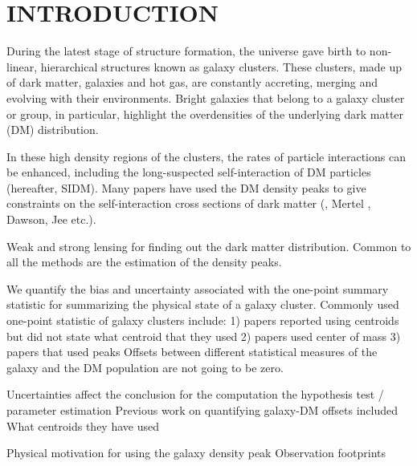 
\section{INTRODUCTION} 
During the latest stage of structure formation, the universe gave birth to
non-linear, hierarchical structures known as galaxy clusters. 
These clusters, made up of dark matter, galaxies and hot gas,
are constantly accreting, merging and evolving with their
environments. Bright galaxies that belong to a galaxy cluster or group, in 
particular, highlight the overdensities of the underlying dark matter (DM) 
distribution. 


In these high density regions of the clusters, the rates of particle
interactions can be enhanced, including the long-suspected self-interaction of DM
particles (hereafter, SIDM). 
Many papers have used the DM density peaks to give constraints on 
the self-interaction cross
sections of dark matter (\citealt{Markevitch2003}, Mertel , Dawson, Jee etc.). 


Weak and strong lensing for finding out the dark matter distribution. 
Common to all the methods are the estimation of the density peaks. 





We quantify the bias and uncertainty associated with the one-point summary
statistic for summarizing the physical state of a galaxy cluster. 
Commonly used one-point statistic of galaxy clusters include:
1) papers reported using centroids but did not state what centroid that they
used 
2) papers used center of mass 
3) papers that used peaks  
Offsets between different statistical measures of the galaxy and the DM
population are not going to be zero.

Uncertainties affect the conclusion for the computation the hypothesis test / parameter
estimation
Previous work on quantifying galaxy-DM offsets included  
What centroids they have used

Physical motivation for using the galaxy density peak 
Observation footprints 

